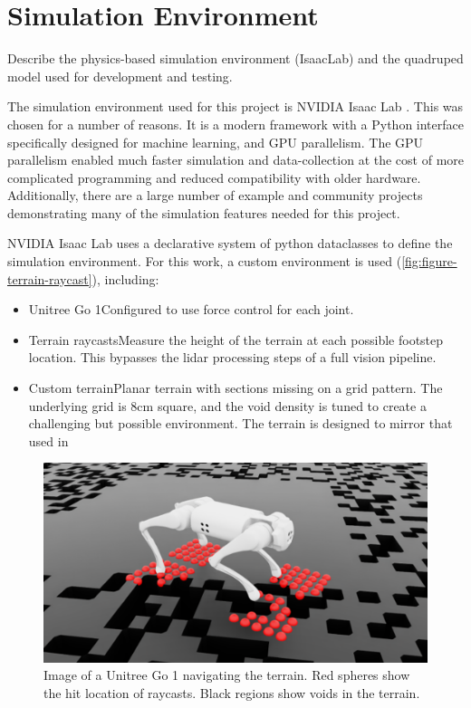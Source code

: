 \section{Simulation Environment}

\begin{outline}
  Describe the physics-based simulation environment (IsaacLab) and the quadruped model used for development and testing.
\end{outline}


The simulation environment used for this project is NVIDIA Isaac Lab \cite{mittal_orbit_2023}. This was chosen for a number of reasons. It is a modern framework with a Python interface specifically designed for machine learning, and GPU parallelism. The GPU parallelism enabled much faster simulation and data-collection at the cost of more complicated programming and reduced compatibility with older hardware. Additionally, there are a large number of example and community projects demonstrating many of the simulation features needed for this project.

NVIDIA Isaac Lab uses a declarative system of python dataclasses to define the simulation environment. For this work, a custom environment is used (\autoref{fig:figure-terrain-raycast}), including:

\begin{itemize}
  \item Unitree Go 1\textemdash Configured to use force control for each joint.
  \item Terrain raycasts\textemdash Measure the height of the terrain at each possible footstep location. This bypasses the lidar processing steps of a full vision pipeline.
  \item Custom terrain\textemdash Planar terrain with sections missing on a grid pattern. The underlying grid is 8cm square, and the void density is tuned to create a challenging but possible environment. The terrain is designed to mirror that used in \cite{bratta_contactnet_2024}
\end{itemize}


\begin{figure}
  \centering
  \includegraphics[width=0.75\linewidth]{images/figures/terrain-raycast.png}
  \caption{Image of a Unitree Go 1 navigating the terrain. Red spheres show the hit location of raycasts. Black regions show voids in the terrain.}
  \label{fig:figure-terrain-raycast}
\end{figure}

